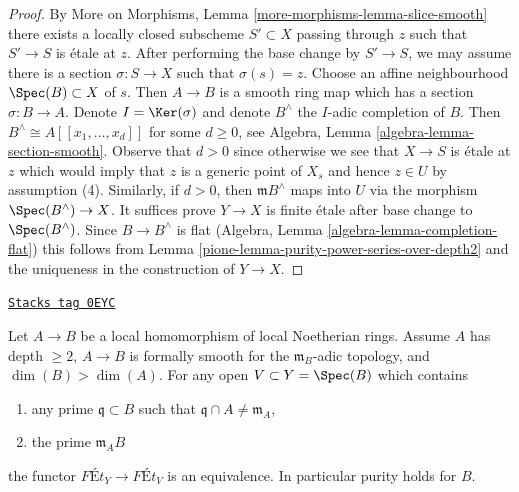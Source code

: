 \begin{proof}
\medskip\noindent
By More on Morphisms, Lemma \ref{more-morphisms-lemma-slice-smooth}
there exists a locally closed subscheme $S' \subset X$ passing through $z$
such that $S' \to S$ is \'etale at $z$. After performing the base change
by $S' \to S$, we may assume there is a section $\sigma : S \to X$
such that $\sigma(s) = z$. Choose an affine neighbourhood
$\Spec(B) \subset X$ of $s$. Then $A \to B$ is a smooth ring
map which has a section $\sigma : B \to A$. Denote $I = \Ker(\sigma)$
and denote $B^\wedge$ the $I$-adic completion of $B$.
Then $B^\wedge \cong A[[x_1, \ldots, x_d]]$ for some $d \geq 0$, see
Algebra, Lemma \ref{algebra-lemma-section-smooth}.
Observe that $d > 0$ since otherwise we see that $X \to S$
is \'etale at $z$ which would imply that $z$ is a generic point of
$X_s$ and hence $z \in U$ by assumption (4).
Similarly, if $d > 0$, then $\mathfrak m B^\wedge$ maps into
$U$ via the morphism $\Spec(B^\wedge) \to X$.
It suffices prove $Y \to X$ is finite \'etale after base change
to $\Spec(B^\wedge)$. Since $B \to B^\wedge$ is flat
(Algebra, Lemma \ref{algebra-lemma-completion-flat})
this follows from Lemma \ref{pione-lemma-purity-power-series-over-depth2}
and the uniqueness in the construction of $Y \to X$.
\end{proof}

\begin{proposition}
\label{pione-proposition-purity-smooth-over-depth2}
\href{https://stacks.math.columbia.edu/tag/0EYC}{\texttt{Stacks tag 0EYC}}

Let $A \to B$ be a local homomorphism of local Noetherian rings.
Assume $A$ has depth $\geq 2$, $A \to B$ is formally smooth for the
$\mathfrak m_B$-adic topology, and $\dim(B) > \dim(A)$. For any open
$V \subset Y = \Spec(B)$ which contains
\begin{enumerate}
\item any prime $\mathfrak q \subset B$ such that
$\mathfrak q \cap A \not = \mathfrak m_A$,
\item the prime $\mathfrak m_A B$
\end{enumerate}
the functor $\textit{F\'Et}_Y \to \textit{F\'Et}_V$
is an equivalence. In particular purity holds for $B$.
\end{proposition}

